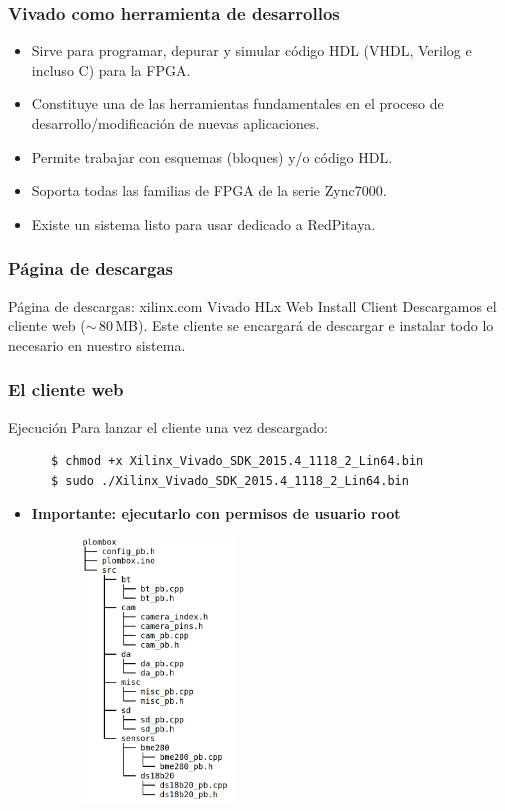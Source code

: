 \documentclass[a4paper,11pt]{article}
\begin{document}
\subsubsection{Vivado como herramienta de desarrollos}
    \begin{itemize}
      \item Sirve para programar, depurar y simular código HDL (VHDL, Verilog e
incluso C) para la FPGA.
      \item Constituye una de las herramientas fundamentales en el proceso de
            desarrollo/modificación de nuevas aplicaciones.
      \item Permite trabajar con esquemas (bloques) y/o código HDL.
      \item Soporta todas las familias de FPGA de la serie Zync7000.
      \item Existe un sistema listo para usar dedicado a RedPitaya.
    \end{itemize}

\subsubsection{Página de descargas}
 Página de descargas: xilinx.com
  Vivado HLx Web Install Client
    Descargamos el cliente web ($\sim$\,80\,MB). Este cliente se encargará de
descargar e instalar todo lo necesario en nuestro sistema.

\subsubsection{El cliente web}
  Ejecución
    Para lanzar el cliente una vez descargado:
    \begin{verbatim}
      $ chmod +x Xilinx_Vivado_SDK_2015.4_1118_2_Lin64.bin
      $ sudo ./Xilinx_Vivado_SDK_2015.4_1118_2_Lin64.bin
    \end{verbatim}
    \begin{itemize}
      \item \textbf{Importante: ejecutarlo con permisos de usuario root}
    \end{itemize}
    \begin{center}
    \includegraphics[height=7cm,width=8cm]{tree_dir}
    \end{center}
\end{document}
